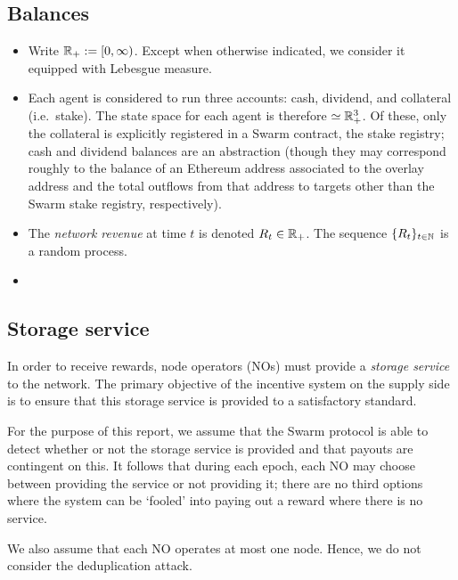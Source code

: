 \subsection{Balances}
\begin{itemize}
  \item 
    Write $\mathbb{R}_+ := [0,\infty)$. Except when otherwise indicated, we consider it equipped with Lebesgue measure.

  \item
    Each agent is considered to run three accounts: cash, dividend, and collateral (i.e.~stake).
    The state space for each agent is therefore $\simeq\mathbb{R}_+^3$.
    Of these, only the collateral is explicitly registered in a Swarm contract, the stake registry; cash and dividend balances are an abstraction (though they may correspond roughly to the balance of an Ethereum address associated to the overlay address and the total outflows from that address to targets other than the Swarm stake registry, respectively).

  \item
    The \emph{network revenue} at time $t$ is denoted $R_t\in \mathbb{R}_+$.
    The sequence $\{R_t\}_{t\in\mathbb{N}}$ is a random process.

  \item

\end{itemize}



\subsection{Storage service}

In order to receive rewards, node operators (NOs) must provide a \emph{storage service} to the network.
%
The primary objective of the incentive system on the supply side is to ensure that this storage service is provided to a satisfactory standard.

For the purpose of this report, we assume that the Swarm protocol is able to detect whether or not the storage service is provided and that payouts are contingent on this.
%
It follows that during each epoch, each NO may choose between providing the service or not providing it; there are no third options where the system can be `fooled' into paying out a reward where there is no service.

We also assume that each NO operates at most one node.
%
Hence, we do not consider the deduplication attack.

